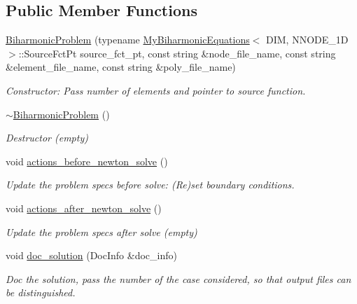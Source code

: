 \subsection*{Public Member Functions}
\begin{DoxyCompactItemize}
\item 
\hyperlink{classBiharmonicProblem_a947d20f6658aa16bb92086a8ed025491}{Biharmonic\+Problem} (typename \hyperlink{classoomph_1_1MyBiharmonicEquations}{My\+Biharmonic\+Equations}$<$ D\+IM, N\+N\+O\+D\+E\+\_\+1D $>$\+::Source\+Fct\+Pt source\+\_\+fct\+\_\+pt, const string \&node\+\_\+file\+\_\+name, const string \&element\+\_\+file\+\_\+name, const string \&poly\+\_\+file\+\_\+name)
\begin{DoxyCompactList}\small\item\em Constructor\+: Pass number of elements and pointer to source function. \end{DoxyCompactList}\item 
\hyperlink{classBiharmonicProblem_aaa512f8c05170aa4a7b97e175db642f3}{$\sim$\+Biharmonic\+Problem} ()
\begin{DoxyCompactList}\small\item\em Destructor (empty) \end{DoxyCompactList}\item 
void \hyperlink{classBiharmonicProblem_ac159c323626ae0514dac820b3f1a2ffb}{actions\+\_\+before\+\_\+newton\+\_\+solve} ()
\begin{DoxyCompactList}\small\item\em Update the problem specs before solve\+: (Re)set boundary conditions. \end{DoxyCompactList}\item 
void \hyperlink{classBiharmonicProblem_ac48f3f4d5164572e711103d7c58de9ed}{actions\+\_\+after\+\_\+newton\+\_\+solve} ()
\begin{DoxyCompactList}\small\item\em Update the problem specs after solve (empty) \end{DoxyCompactList}\item 
void \hyperlink{classBiharmonicProblem_a0cb56f30738170a8d2bfd1c8d1000fd4}{doc\+\_\+solution} (Doc\+Info \&doc\+\_\+info)
\begin{DoxyCompactList}\small\item\em Doc the solution, pass the number of the case considered, so that output files can be distinguished. \end{DoxyCompactList}\end{DoxyCompactItemize}

